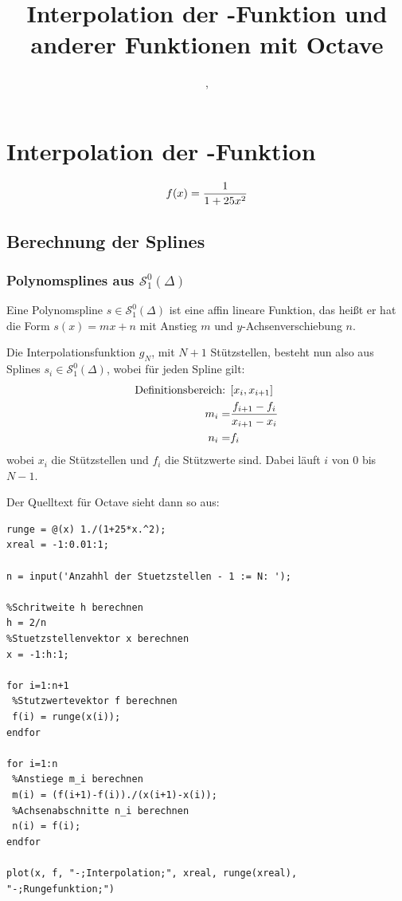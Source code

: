 \documentclass[ngerman,a4paper]{texmf/tex/latex/mathscript/mathscript}
\title{\textbf{Interpolation der \person{Runge}-Funktion und anderer Funktionen mit Octave}}
\author{\person{Henry Haustein}, \person{Lars Ortscheidt}}
\begin{document}
\maketitle
	
\tableofcontents
\pagebreak
	
\section{Interpolation der -Funktion}	
	\begin{align}
		f(x) = \frac{1}{1+25x^2}\notag
	\end{align}
	
	\subsection{Berechnung der Splines}
	\subsubsection{Polynomsplines aus $\mathcal{S}_1^0(\Delta)$}
	
	Eine Polynomspline $s\in\mathcal{S}_1^0(\Delta)$ ist eine affin lineare Funktion, das heißt er hat die Form $s(x)=mx+n$ mit Anstieg $m$ und $y$-Achsenverschiebung $n$. 
	
	Die Interpolationsfunktion $g_N$, mit $N+1$ Stützstellen, besteht nun also aus Splines $s_i\in\mathcal{S}_1^0(\Delta)$, wobei für jeden Spline gilt:
	\begin{align}
		\text{Definitionsbereich: } & [x_i,x_{i+1}] \notag \\
		m_i =& \frac{f_{i+1}-f_i}{x_{i+1}-x_i}\notag \\
		n_i =& f_i \notag
	\end{align} 
	wobei $x_i$ die Stützstellen und $f_i$ die Stützwerte sind. Dabei läuft $i$ von $0$ bis $N-1$.
	
	Der Quelltext für Octave sieht dann so aus:
\begin{lstlisting}
runge = @(x) 1./(1+25*x.^2);
xreal = -1:0.01:1;

n = input('Anzahhl der Stuetzstellen - 1 := N: ');

%Schritweite h berechnen
h = 2/n
%Stuetzstellenvektor x berechnen
x = -1:h:1;

for i=1:n+1
 %Stutzwertevektor f berechnen
 f(i) = runge(x(i));
endfor

for i=1:n
 %Anstiege m_i berechnen
 m(i) = (f(i+1)-f(i))./(x(i+1)-x(i));
 %Achsenabschnitte n_i berechnen
 n(i) = f(i);
endfor

plot(x, f, "-;Interpolation;", xreal, runge(xreal), "-;Rungefunktion;")
\end{lstlisting}
\end{document}
